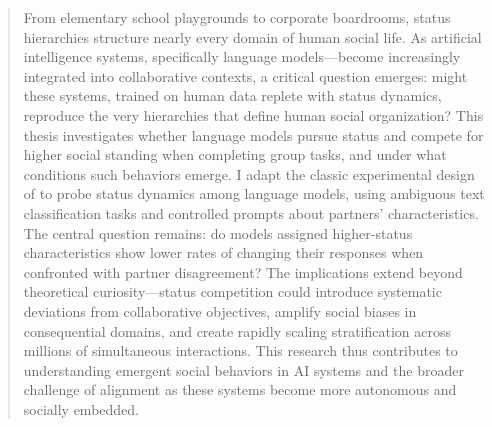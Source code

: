 \documentclass[10pt]{article}
\begin{document}
\begin{abstract}
    From elementary school playgrounds to corporate boardrooms, status hierarchies structure nearly every domain of human social life. As artificial intelligence systems, specifically language models—become increasingly integrated into collaborative contexts, a critical question emerges: might these systems, trained on human data replete with status dynamics, reproduce the very hierarchies that define human social organization? This thesis investigates whether language models pursue status and compete for higher social standing when completing group tasks, and under what conditions such behaviors emerge. I adapt the classic experimental design of \citet{Berger-1972-Status} to probe status dynamics among language models, using ambiguous text classification tasks and controlled prompts about partners' characteristics. The central question remains: do models assigned higher-status characteristics show lower rates of changing their responses when confronted with partner disagreement? The implications extend beyond theoretical curiosity—status competition could introduce systematic deviations from collaborative objectives, amplify social biases in consequential domains, and create rapidly scaling stratification across millions of simultaneous interactions. This research thus contributes to understanding emergent social behaviors in AI systems and the broader challenge of alignment as these systems become more autonomous and socially embedded.
\end{abstract}














\end{document}
